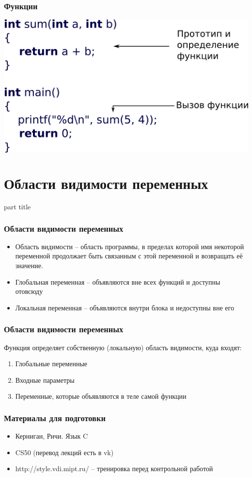 \documentclass[14pt,pdf,hyperref={unicode}]{beamer}
\begin{document}
\begin{frame}[fragile]
\frametitle{Функции} 
\begin{center}
\includegraphics[width=0.8\linewidth]{images/function_summary2.png}

\end{center}
\end{frame}




\section{Области видимости переменных}
\begin{frame}
\begin{center}
\begin{beamercolorbox}[sep=8pt,center]{part
title}
\insertsection
\end{beamercolorbox}
\end{center}
\end{frame}

\begin{frame}[fragile]
\frametitle{Области видимости переменных} 
\begin{itemize}
\item Область видимости -- область программы, в пределах которой имя некоторой переменной продолжает быть связанным с этой переменной и возвращать её значение.
\item Глобальная переменная -- объявляются вне всех функций и доступны отовсюду
\item Локальная переменная --  объявляются внутри блока и недоступны вне его
\end{itemize}
\end{frame}

\begin{frame}[fragile]
\frametitle{Области видимости переменных} 
Функция определяет собственную (локальную) область видимости, куда входят:
\begin{enumerate}
\item Глобальные переменные
\item Входные параметры
\item Переменные, которые объявляются в теле самой функции
\end{enumerate}
\end{frame}





\begin{frame}[fragile]
\frametitle{Материалы для подготовки} 
\begin{itemize}
\item Керниган, Ричи. Язык C
\item CS50 (перевод лекций есть в vk)
\item http://style.vdi.mipt.ru/  -- тренировка перед контрольной работой
\end{itemize}
\end{frame}
\end{document}
